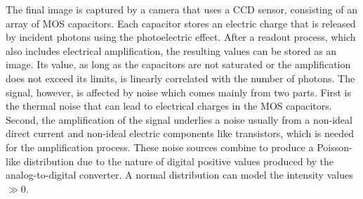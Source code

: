 %
The final image is captured by a camera that uses a \ac{CCD} sensor, consisting of an array of \ac{MOS} capacitors.
Each capacitor stores an electric charge that is released by incident photons using the photoelectric effect.
After a readout process, which also includes electrical amplification, the resulting values can be stored as an image.
Its value, as long as the capacitors are not saturated or the amplification does not exceed its limits, is linearly correlated with the number of photons.
The signal, however, is affected by noise which comes mainly from two parts.
First is the thermal noise that can lead to electrical charges in the \ac{MOS} capacitors.
Second, the amplification of the signal underlies a noise usually from a non-ideal direct current and non-ideal electric components like transistors, which is needed for the amplification process.
These noise sources combine to produce a Poisson-like distribution due to the nature of digital positive values produced by the analog-to-digital converter.
A normal distribution can model the intensity values $\gg 0$.
%
%
%
